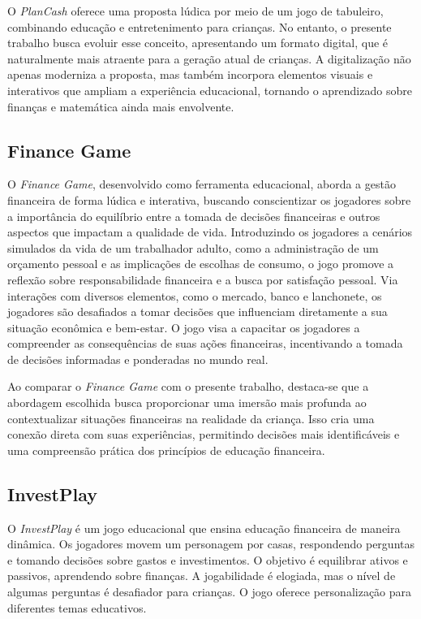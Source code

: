             O \textit{PlanCash}\cite{mariano2020educaccao} oferece uma proposta lúdica por meio de um jogo de tabuleiro, combinando educação e entretenimento para crianças. No  entanto, o presente trabalho busca evoluir esse conceito, apresentando um formato digital, que é naturalmente mais atraente para a geração atual de crianças. A digitalização não apenas moderniza a proposta, mas também incorpora elementos visuais e interativos que ampliam a experiência educacional, tornando o aprendizado sobre finanças e matemática ainda mais envolvente.            

        \subsection{Finance Game}
            O \textit{Finance Game}\cite{Finance_Game}, desenvolvido como ferramenta educacional, aborda a gestão financeira de forma lúdica e interativa, buscando conscientizar os jogadores sobre a importância do equilíbrio entre a tomada de decisões financeiras e outros aspectos que impactam a qualidade de vida. Introduzindo os jogadores a cenários simulados da vida de um trabalhador adulto, como a administração de um orçamento pessoal e as implicações de escolhas de consumo, o jogo promove a reflexão sobre responsabilidade financeira e a busca por satisfação pessoal. Via interações com diversos elementos, como o mercado, banco e lanchonete, os jogadores são desafiados a tomar decisões que influenciam diretamente a sua situação econômica e bem-estar. O jogo visa a capacitar os jogadores a compreender as consequências de suas ações financeiras, incentivando a tomada de decisões informadas e ponderadas no mundo real.
            
            Ao comparar o \textit{Finance Game}\cite{Finance_Game} com o presente trabalho, destaca-se que a abordagem escolhida busca proporcionar uma imersão mais profunda ao contextualizar situações financeiras na realidade da criança. Isso cria uma conexão direta com suas experiências, permitindo decisões mais identificáveis e uma compreensão prática dos princípios de educação financeira.

        \subsection{InvestPlay}            
            O \textit{InvestPlay}\cite{santos2020investplay} é um jogo educacional que ensina educação financeira de maneira dinâmica. Os jogadores movem um personagem por casas, respondendo perguntas e tomando decisões sobre gastos e investimentos. O objetivo é equilibrar ativos e passivos, aprendendo sobre finanças. A jogabilidade é elogiada, mas o nível de algumas perguntas é desafiador para crianças. O jogo oferece personalização para diferentes temas educativos.           

